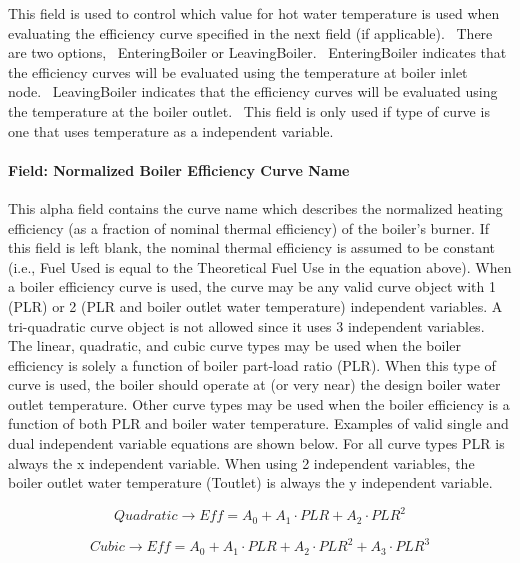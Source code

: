 This field is used to control which value for hot water temperature is used when evaluating the efficiency curve specified in the next field (if applicable).~ There are two options,~ EnteringBoiler or LeavingBoiler.~ EnteringBoiler indicates that the efficiency curves will be evaluated using the temperature at boiler inlet node.~ LeavingBoiler indicates that the efficiency curves will be evaluated using the temperature at the boiler outlet.~ This field is only used if type of curve is one that uses temperature as a independent variable.

\paragraph{Field: Normalized Boiler Efficiency Curve Name}\label{field-normalized-boiler-efficiency-curve-name}

This alpha field contains the curve name which describes the normalized heating efficiency (as a fraction of nominal thermal efficiency) of the boiler's burner. If this field is left blank, the nominal thermal efficiency is assumed to be constant (i.e., Fuel Used is equal to the Theoretical Fuel Use in the equation above). When a boiler efficiency curve is used, the curve may be any valid curve object with 1 (PLR) or 2 (PLR and boiler outlet water temperature) independent variables. A tri-quadratic curve object is not allowed since it uses 3 independent variables. The linear, quadratic, and cubic curve types may be used when the boiler efficiency is solely a function of boiler part-load ratio (PLR). When this type of curve is used, the boiler should operate at (or very near) the design boiler water outlet temperature. Other curve types may be used when the boiler efficiency is a function of both PLR and boiler water temperature. Examples of valid single and dual independent variable equations are shown below. For all curve types PLR is always the x independent variable. When using 2 independent variables, the boiler outlet water temperature (Toutlet) is always the y independent variable.

\begin{equation}
    Quadratic \to Eff = {A_0} + {A_1}\cdot PLR + {A_2}\cdot PL{R^2}
\end{equation}

\begin{equation}
    Cubic \to Eff = {A_0} + {A_1}\cdot PLR + {A_2}\cdot PL{R^2} + {A_3}\cdot PL{R^3}
\end{equation}

